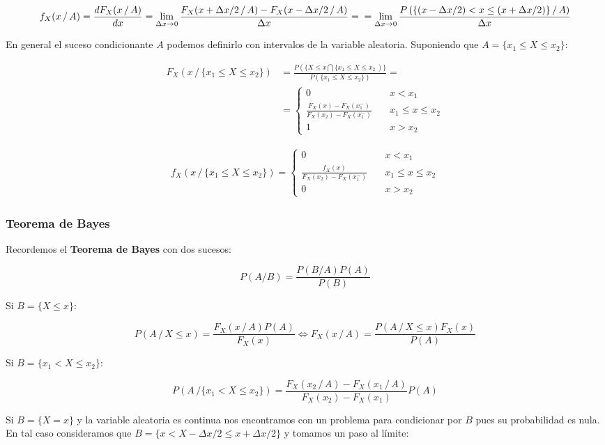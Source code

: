 \documentclass[11pt]{article}
\begin{document}
\[f_X(x \, /\, A)=\frac{dF_X(x \, /\, A)}{dx}=\lim \limits_{\Delta x \to 0} \frac{F_X(x+\Delta x/2 \, /\, A)-F_X(x-\Delta x/2 \, /\, A)}{\Delta x}= \\
=\lim \limits_{\Delta x \to 0} \frac{P\left(\{(x-\Delta x/2) < x \leq (x+\Delta x/2)\} \, /\, A \right)}{\Delta x} \]

    En general el suceso condicionante \(A\) podemos definirlo con
intervalos de la variable aleatoria. Suponiendo que
\(A=\{x_1\leq X \leq x_2\}\):

\begin{align*}
F_X(x\, /\, \{x_1\leq X \leq x_2\}) & = \frac{P(\{X \leq x \bigcap \{x_1\leq X \leq x_2\ )\} }{P(\{x_1\leq X \leq x_2\})}=\\
 & = \begin{cases}
    0       & \quad x < x_1\\
    \frac{F_X(x)-F_X(x_1^-)}{F_X(x_2)-F_X(x_1^-)}  & \quad x_1 \leq x \leq x_2\\
    1 &\quad x > x_2
  \end{cases}
\end{align*}

\begin{align*}
f_X(x\, /\, \{x_1\leq X \leq x_2\}) = \begin{cases}
    0       & \quad x < x_1\\
    \frac{f_X(x)}{F_X(x_2)-F_X(x_1^-)}  & \quad x_1 \leq x \leq x_2\\
    0 &\quad x > x_2
  \end{cases}
\end{align*}

    \hypertarget{teorema-de-bayes}{%
\subsubsection*{Teorema de Bayes}\label{teorema-de-bayes}}

Recordemos el \textbf{Teorema de Bayes} con dos sucesos:

\[P(A/B) = \frac{P(B/A)P(A)}{P(B)}\]

Si \(B=\{X \leq x\}\):

\[P(A\, / \, X \leq x) = \frac{F_X(x \, / \, A)P(A)}{F_X(x)} \iff F_X(x \, / \, A) = \frac{P(A\, / \, X \leq x)F_X(x)}{P(A)}\]

Si \(B=\{x_1 < X \leq x_2\}\):

\[P(A\, / \{x_1 < X \leq x_2\}) = \frac{F_X(x_2 \, / \, A)-F_X(x_1 \, / \, A)}{F_X(x_2)-F_X(x_1)}P(A)\]

    Si \(B=\{X=x\}\) y la variable aleatoria es continua nos encontramos con
un problema para condicionar por \(B\) pues su probabilidad es nula. En
tal caso consideramos que \(B=\{x<X-\Delta x/2 \leq x+\Delta x/2\}\) y
tomamos un paso al límite:
\end{document}
